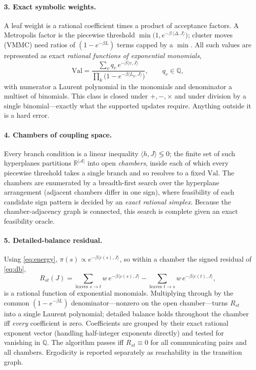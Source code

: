 \documentclass[10pt]{article}
\newcommand{\R}{\mathbb{R}}
\newcommand{\Q}{\mathbb{Q}}
\begin{document}
\paragraph{3. Exact symbolic weights.}
A leaf weight is a rational coefficient times a product of acceptance factors.
A Metropolis factor is the piecewise threshold
$\min\!\big(1,e^{-\beta\,\langle \Delta,J\rangle}\big)$; cluster moves (VMMC) need
ratios of $(1-e^{-\beta L})$ terms capped by a $\min$. All such values are
represented as exact \emph{rational functions of exponential monomials},
\begin{equation}\label{eq:val}
\mathrm{Val}=\frac{\textstyle\sum_{v} q_v\,e^{-\beta\langle v,J\rangle}}
                  {\textstyle\prod_{k}\big(1-e^{-\beta\langle L_k,J\rangle}\big)},
\qquad q_v\in\Q,
\end{equation}
with numerator a Laurent polynomial in the monomials and denominator a multiset of
binomials. This class is closed under $+,-,\times$ and under division by a single
binomial---exactly what the supported updates require. Anything outside it is a
hard error.

\paragraph{4. Chambers of coupling space.}
Every branch condition is a linear inequality $\langle h,J\rangle\lessgtr 0$; the
finite set of such hyperplanes partitions $\R^{|\mathcal{A}|}$ into open
\emph{chambers}, inside each of which every piecewise threshold takes a single
branch and so resolves to a fixed $\mathrm{Val}$. The chambers are enumerated by a
breadth-first search over the hyperplane arrangement (adjacent chambers differ in
one sign), where feasibility of each candidate sign pattern is decided by an
\emph{exact rational simplex}. Because the chamber-adjacency graph is connected,
this search is complete given an exact feasibility oracle.

\paragraph{5. Detailed-balance residual.}
Using \eqref{eq:energy}, $\pi(s)\propto e^{-\beta\langle c(s),J\rangle}$, so within
a chamber the signed residual of \eqref{eq:db},
\begin{equation}\label{eq:res}
R_{st}(J)=\sum_{\text{leaves }s\to t} w\,e^{-\beta\langle c(s),J\rangle}
         -\sum_{\text{leaves }t\to s} w\,e^{-\beta\langle c(t),J\rangle},
\end{equation}
is a rational function of exponential monomials. Multiplying through by the common
$(1-e^{-\beta L})$ denominator---nonzero on the open chamber---turns $R_{st}$ into a
single Laurent polynomial; detailed balance holds throughout the chamber iff
\emph{every} coefficient is zero. Coefficients are grouped by their exact rational
exponent vector (handling half-integer exponents directly) and tested for
vanishing in $\Q$. The algorithm passes iff $R_{st}\equiv0$ for all communicating
pairs and all chambers. Ergodicity is reported separately as reachability in the
transition graph.
\end{document}
